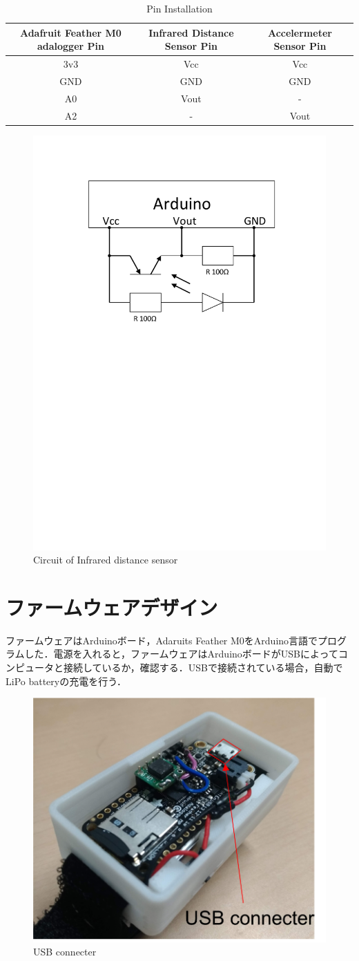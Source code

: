 \begin{table}[H]
  \caption{Pin Installation}
  \centering
  \begin{tabular}{ccc}
    \hline
    Adafruit Feather M0 adalogger Pin & Infrared Distance Sensor Pin & Accelermeter Sensor Pin\\
    \hline \hline
    3v3 & Vcc & Vcc  \\
    GND & GND & GND  \\
    A0  & Vout& - \\
    A2  & -& Vout \\
    \hline
  \end{tabular}
   \label{table:pin}
\end{table}

\begin{figure}[H]
  \centering
  \includegraphics[width=0.5\linewidth]{fig/test}
  \caption{Circuit of Infrared distance sensor }
  \label{fig:circuit}{}
\end{figure}


\section{ファームウェアデザイン}
ファームウェアはArduinoボード，Adaruits Feather M0をArduino言語でプログラムした．電源を入れると，ファームウェアはArduinoボードがUSBによってコンピュータと接続しているか，確認する．USBで接続されている場合，自動でLiPo batteryの充電を行う．

\begin{figure}[H]
  \centering
  \includegraphics[width=0.3\linewidth]{fig/usbconne}
  \caption{USB connecter}
  \label{fig:USB connecter}
\end{figure}


